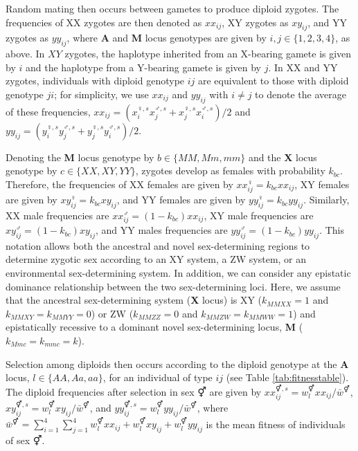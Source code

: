 \documentclass[12pt]{article}
\begin{document}
Random mating then occurs between gametes to produce diploid zygotes.
The frequencies of XX zygotes are then denoted as $xx_{ij}$, XY zygotes as $xy_{ij}$, and YY zygotes as $yy_{ij}$, where \textbf{A} and \textbf{M} locus genotypes are given by $i,j\in\{1,2,3,4\}$, as above. 
In $XY$ zygotes, the haplotype inherited from an X-bearing gamete is given by $i$ and the haplotype from a Y-bearing gamete is given by $j$. 
In XX and YY zygotes, individuals with diploid genotype $ij$ are equivalent to those with diploid genotype $ji$; for simplicity, we use $xx_{ij}$ and $yy_{ij}$ with $i\neq j$ to denote the average of these frequencies, $xx_{ij}=(x_{i}^{\female,s}x_{j}^{\male,s}+x_{j}^{\female,s}x_{i}^{\male,s})/2$ and $yy_{ij}=(y_{i}^{\female,s}y_{j}^{\male,s}+y_{j}^{\female,s}y_{i}^{\male,s})/2$. 


Denoting the \textbf{M} locus genotype by $b \in \{MM, Mm, mm\}$ and the \textbf{X} locus genotype by $c \in \{XX, XY, YY\}$, zygotes develop as females with probability $k_{bc}$. 
Therefore, the frequencies of XX females are given by $xx_{ij}^{\female}=k_{bc}xx_{ij}$, XY females are given by $xy_{ij}^{\female}=k_{bc}xy_{ij}$, and YY females are given by $yy_{ij}^{\female}=k_{bc}yy_{ij}$. 
Similarly, XX male frequencies are $xx_{ij}^{\male}=(1-k_{bc})xx_{ij}$, XY male frequencies are $xy_{ij}^{\male}=(1-k_{bc})xy_{ij}$, and YY males frequencies are $yy_{ij}^{\male}=(1-k_{bc})yy_{ij}$.
This notation allows both the ancestral and novel sex-determining regions to determine zygotic sex according to an XY system, a ZW system, or an environmental sex-determining system. 
In addition, we can consider any epistatic dominance relationship between the two sex-determining loci. 
Here, we assume that the ancestral sex-determining system (\textbf{X} locus) is XY ($k_{MMXX}=1$ and $k_{MMXY}=k_{MMYY}=0$) or ZW ($k_{MMZZ}=0$ and $k_{MMZW}=k_{MMWW}=1$) and epistatically recessive to a dominant novel sex-determining locus, \textbf{M} ($k_{Mmc}=k_{mmc}=k$). 


Selection among diploids then occurs according to the diploid genotype at the \textbf{A} locus, $l \in \{AA, Aa, aa\}$, for an individual of type $ij$ (see Table \ref{tab:fitnesstable}). 
The diploid frequencies after selection in sex $\Hermaphrodite$ are given by $xx_{ij}^{\Hermaphrodite,s}=w_{l}^{\Hermaphrodite} xx_{ij}/\bar{w}^{\Hermaphrodite}$, $xy_{ij}^{\Hermaphrodite,s}=w_{l}^{\Hermaphrodite} xy_{ij}/\bar{w}^{\Hermaphrodite}$, and $yy_{ij}^{\Hermaphrodite,s}=w_{l}^{\Hermaphrodite} yy_{ij}/\bar{w}^{\Hermaphrodite}$, where $\bar{w}^{\Hermaphrodite}= \sum_{i=1}^{4}\sum_{j=1}^{4}w_{l}^{\Hermaphrodite}xx_{ij}+w_{l}^{\Hermaphrodite}xy_{ij}+w_{l}^{\Hermaphrodite}yy_{ij}$ is the mean fitness of individuals of sex $\Hermaphrodite$. 
\end{document}

